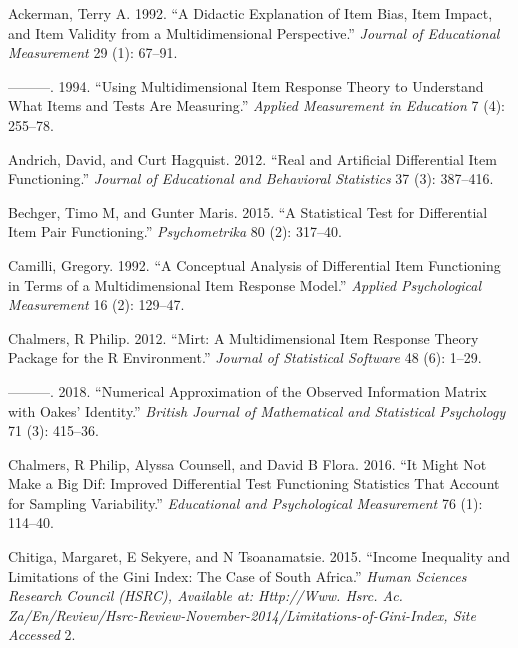 \documentclass[
  11pt,
]{article}
\begin{document}
\clearpage




\hypertarget{refs}{}
\leavevmode\hypertarget{ref-ackerman1992didactic}{}%
Ackerman, Terry A. 1992. ``A Didactic Explanation of Item Bias, Item Impact, and Item Validity from a Multidimensional Perspective.'' \emph{Journal of Educational Measurement} 29 (1): 67--91.

\leavevmode\hypertarget{ref-ackerman1994using}{}%
---------. 1994. ``Using Multidimensional Item Response Theory to Understand What Items and Tests Are Measuring.'' \emph{Applied Measurement in Education} 7 (4): 255--78.

\leavevmode\hypertarget{ref-andrich2012real}{}%
Andrich, David, and Curt Hagquist. 2012. ``Real and Artificial Differential Item Functioning.'' \emph{Journal of Educational and Behavioral Statistics} 37 (3): 387--416.

\leavevmode\hypertarget{ref-bechger2015statistical}{}%
Bechger, Timo M, and Gunter Maris. 2015. ``A Statistical Test for Differential Item Pair Functioning.'' \emph{Psychometrika} 80 (2): 317--40.

\leavevmode\hypertarget{ref-camilli1992conceptual}{}%
Camilli, Gregory. 1992. ``A Conceptual Analysis of Differential Item Functioning in Terms of a Multidimensional Item Response Model.'' \emph{Applied Psychological Measurement} 16 (2): 129--47.

\leavevmode\hypertarget{ref-chalmers2012mirt}{}%
Chalmers, R Philip. 2012. ``Mirt: A Multidimensional Item Response Theory Package for the R Environment.'' \emph{Journal of Statistical Software} 48 (6): 1--29.

\leavevmode\hypertarget{ref-chalmers2018numerical}{}%
---------. 2018. ``Numerical Approximation of the Observed Information Matrix with Oakes' Identity.'' \emph{British Journal of Mathematical and Statistical Psychology} 71 (3): 415--36.

\leavevmode\hypertarget{ref-chalmers2016might}{}%
Chalmers, R Philip, Alyssa Counsell, and David B Flora. 2016. ``It Might Not Make a Big Dif: Improved Differential Test Functioning Statistics That Account for Sampling Variability.'' \emph{Educational and Psychological Measurement} 76 (1): 114--40.

\leavevmode\hypertarget{ref-chitiga2015income}{}%
Chitiga, Margaret, E Sekyere, and N Tsoanamatsie. 2015. ``Income Inequality and Limitations of the Gini Index: The Case of South Africa.'' \emph{Human Sciences Research Council (HSRC), Available at: Http://Www. Hsrc. Ac. Za/En/Review/Hsrc-Review-November-2014/Limitations-of-Gini-Index, Site Accessed} 2.
\end{document}
